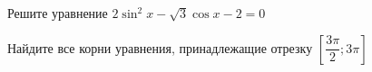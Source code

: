 \begin{ex}
	\begin{condition}
		\begin{enumcols}[label=\asbuk*)]
			\item Решите уравнение \( 2\sin^2 x - \sqrt{3}\cos x -2 = 0 \)
			\item Найдите все корни уравнения, принадлежащие отрезку \(  \left[\dfrac{3\pi}{2};3\pi\right] \)
		\end{enumcols}
	\end{condition}
\end{ex}